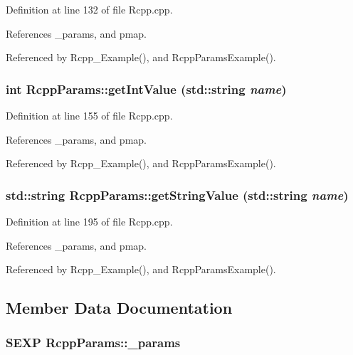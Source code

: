 Definition at line 132 of file Rcpp.cpp.

References \_\-params, and pmap.

Referenced by Rcpp\_\-Example(), and RcppParamsExample().\hypertarget{classRcppParams_abb554151641ab12a793f28d3d081973a}{
\subsubsection[{getIntValue}]{\setlength{\rightskip}{0pt plus 5cm}int RcppParams::getIntValue (std::string {\em name})}}
\label{classRcppParams_abb554151641ab12a793f28d3d081973a}


Definition at line 155 of file Rcpp.cpp.

References \_\-params, and pmap.

Referenced by Rcpp\_\-Example(), and RcppParamsExample().\hypertarget{classRcppParams_adc04f4552582eeec09b0806ddd8e2581}{
\subsubsection[{getStringValue}]{\setlength{\rightskip}{0pt plus 5cm}std::string RcppParams::getStringValue (std::string {\em name})}}
\label{classRcppParams_adc04f4552582eeec09b0806ddd8e2581}


Definition at line 195 of file Rcpp.cpp.

References \_\-params, and pmap.

Referenced by Rcpp\_\-Example(), and RcppParamsExample().

\subsection{Member Data Documentation}
\hypertarget{classRcppParams_a3040dda3b32eff66fb73d3ba3874ca5b}{
\subsubsection[{\_\-params}]{\setlength{\rightskip}{0pt plus 5cm}SEXP {\bf RcppParams::\_\-params}}}
\label{classRcppParams_a3040dda3b32eff66fb73d3ba3874ca5b}


